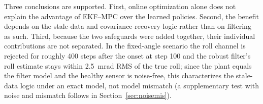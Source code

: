 \documentclass[preprint,12pt,authoryear=false]{elsarticle}
\theoremstyle{remark}\newtheorem{remark}{Remark}
\theoremstyle{plain}\newtheorem{proposition}{Proposition}\newtheorem{lemma}{Lemma}
\theoremstyle{definition}\newtheorem{assumption}{Assumption}
\begin{document}
\begin{table}[t]\centering\small
\caption{Survival (\%) with matched information (300 cases per scenario and policy; residual and Pure SAC aggregate five policies each). The last row is the EKF--MPC of Table~\ref{tab:focus}.}\label{tab:match}
\end{table}

Three conclusions are supported. First, online optimization alone does not explain the advantage of EKF--MPC over the learned policies. Second, the benefit depends on the stale-data and covariance-recovery logic rather than on filtering as such. Third, because the two safeguards were added together, their individual contributions are not separated. In the fixed-angle scenario the roll channel is rejected for roughly 400 steps after the onset at step 100 and the robust filter's roll estimate stays within \SI{2.5}{mrad} RMS of the true roll; since the plant equals the filter model and the healthy sensor is noise-free, this characterizes the stale-data logic under an exact model, not model mismatch (a supplementary test with noise and mismatch follows in Section~\ref{sec:noisemis}).
\end{document}
